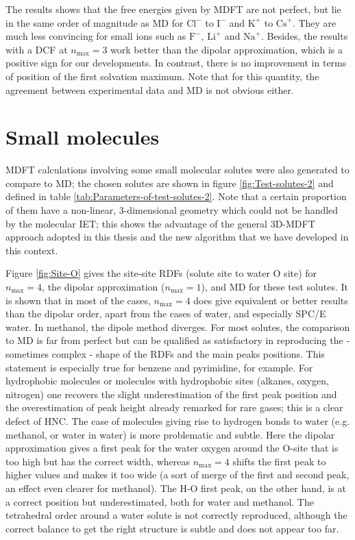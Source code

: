 The results shows that the free energies given by \acs{MDFT} are not
perfect, but lie in the same order of magnitude as \acs{MD} for $\mathrm{Cl}^{-}$
to $\mathrm{I}^{-}$ and $\mathrm{K}^{+}$ to $\mathrm{Cs}^{+}$.
They are much less convincing for small ions such as $\mathrm{F}^{-}$,
$\mathrm{Li}^{+}$ and $\mathrm{Na}^{+}$. Besides, the results with
a \acs{DCF} at $n_{\max}=3$ work better than the dipolar approximation,
which is a positive sign for our developments. In contrast, there
is no improvement in terms of position of the first solvation maximum.
Note that for this quantity, the agreement between experimental data
and \acs{MD} is not obvious either. 

\section{Small molecules}

\acs{MDFT} calculations involving some small molecular solutes were
also generated to compare to \acs{MD}; the chosen solutes are shown
in figure \ref{fig:Test-solutes-2} and defined in table \ref{tab:Parameters-of-test-solutes-2}.
Note that a certain proportion of them have a non-linear, 3-dimensional
geometry which could not be handled by the molecular \acs{IET}; this
shows the advantage of the general 3D-\acs{MDFT} approach adopted
in this thesis and the new algorithm that we have developed in this
context.

Figure \ref{fig:Site-O} gives the site-site \acs{RDF}s (solute site
to water O site) for $n_{\max}=4$, the dipolar approximation ($n_{\max}=1$),
and \acs{MD} for these test solutes. It is shown that in most
of the cases, $n_{\max}=4$ does give equivalent or better results
than the dipolar order, apart from the cases of water, and especially
SPC/E water. In methanol, the dipole method diverges. For most solutes,
the comparison to \acs{MD} is far from perfect but can be qualified
as satisfactory in reproducing the - sometimes complex - shape of
the \acs{RDF}s and the main peaks positions. This statement is especially
true for benzene and pyrimidine, for example. For hydrophobic molecules
or molecules with hydrophobic sites (alkanes, oxygen, nitrogen)
one recovers the slight underestimation of the first peak position
and the overestimation of peak height already remarked for
rare gases; this is a clear defect of \acs{HNC}. The case of molecules
giving rise to hydrogen bonds to water (e.g. methanol, or water in
water) is more problematic and subtle. Here the dipolar approximation
gives a first peak for the water oxygen around the O-site that is
too high but has the correct width, whereas $n_{\max}=4$ shifts the
first peak to higher values and makes it too wide (a sort of merge
of the first and second peak, an effect even clearer for methanol).
The H-O first peak, on the other hand, is at a correct position but
underestimated, both for water and methanol. The tetrahedral order
around a water solute is not correctly reproduced, although the correct
balance to get the right structure is subtle and does not appear too
far. 

